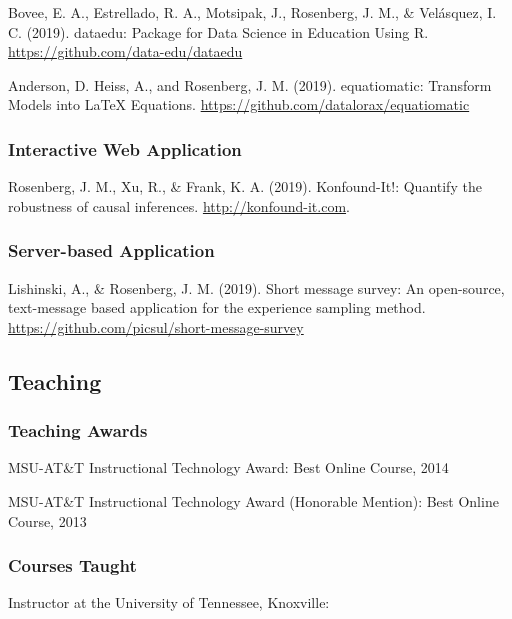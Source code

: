 \documentclass[14,]{article}
\begin{document}
Bovee, E. A., Estrellado, R. A., Motsipak, J., Rosenberg, J. M., \&
Velásquez, I. C. (2019). dataedu: Package for Data Science in Education
Using R. \url{https://github.com/data-edu/dataedu}

Anderson, D. Heiss, A., and Rosenberg, J. M. (2019). equatiomatic:
Transform Models into LaTeX Equations.
\url{https://github.com/datalorax/equatiomatic}

\hypertarget{interactive-web-application}{%
\subsubsection{Interactive Web
Application}\label{interactive-web-application}}

Rosenberg, J. M., Xu, R., \& Frank, K. A. (2019). Konfound-It!: Quantify
the robustness of causal inferences. \url{http://konfound-it.com}.

\hypertarget{server-based-application}{%
\subsubsection{Server-based
Application}\label{server-based-application}}

Lishinski, A., \& Rosenberg, J. M. (2019). Short message survey: An
open-source, text-message based application for the experience sampling
method. \url{https://github.com/picsul/short-message-survey}

\hypertarget{teaching}{%
\subsection{Teaching}\label{teaching}}

\hypertarget{teaching-awards}{%
\subsubsection{Teaching Awards}\label{teaching-awards}}

MSU-AT\&T Instructional Technology Award: Best Online Course, 2014

MSU-AT\&T Instructional Technology Award (Honorable Mention): Best
Online Course, 2013

\hypertarget{courses-taught}{%
\subsubsection{Courses Taught}\label{courses-taught}}

Instructor at the University of Tennessee, Knoxville:
\end{document}
